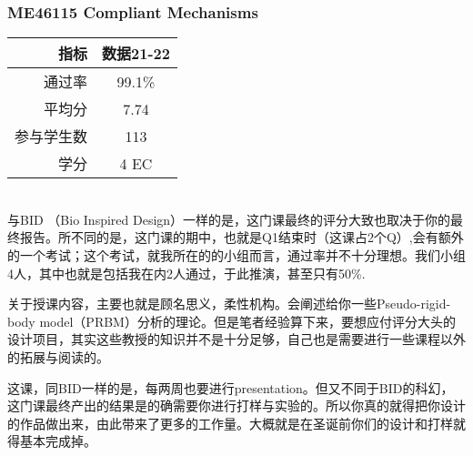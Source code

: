 \subsubsection{ME46115 Compliant Mechanisms}
\begin{minipage}{0.45\textwidth}
\centering
{}
\end{minipage}%
\begin{minipage}{0.45\textwidth}
\raggedleft
\begin{tabular}{r|c}
\textbf{指标} & \textbf{数据21-22} \\ \hline
通过率 & 99.1\%\\ 
平均分 & 7.74 \\ 
参与学生数 & 113 \\ 
学分 & 4 EC\\
\end{tabular}
\end{minipage}\\

与BID （Bio Inspired Design）一样的是，这门课最终的评分大致也取决于你的最终报告。所不同的是，这门课的期中，也就是Q1结束时（这课占2个Q）,会有额外的一个考试；这个考试，就我所在的的小组而言，通过率并不十分理想。我们小组4人，其中也就是包括我在内2人通过，于此推演，甚至只有50\%.

关于授课内容，主要也就是顾名思义，柔性机构。会阐述给你一些Pseudo-rigid-body model（PRBM）分析的理论。但是笔者经验算下来，要想应付评分大头的设计项目，其实这些教授的知识并不是十分足够，自己也是需要进行一些课程以外的拓展与阅读的。

这课，同BID一样的是，每两周也要进行presentation。但又不同于BID的科幻，这门课最终产出的结果是的确需要你进行打样与实验的。所以你真的就得把你设计的作品做出来，由此带来了更多的工作量。大概就是在圣诞前你们的设计和打样就得基本完成掉。

